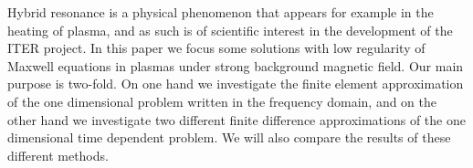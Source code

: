 Hybrid resonance is a physical phenomenon
that appears for example in the heating of plasma,
and as such is of scientific interest in the development  of  the ITER project.
In this paper we focus some solutions with low regularity of Maxwell equations in
plasmas under strong background magnetic field.
Our main purpose is two-fold.
On one hand we investigate the finite element approximation of the one dimensional problem 
written in the frequency domain, and on the other hand we investigate two different 
finite difference approximations of the one dimensional time dependent problem.
We will also compare the results of these different methods.